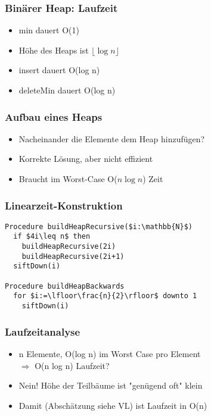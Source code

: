 

\begin{frame}
  \titlepage
\end{frame}

\begin{frame}
\frametitle{Binärer Heap: Laufzeit}
\begin{itemize}
\item min dauert O(1)\pause
\item Höhe des Heaps ist $\lfloor\log n\rfloor$\pause
\item insert dauert O(log n)
\item deleteMin dauert O(log n)
\end{itemize}
\end{frame}

\begin{frame}
\frametitle{Aufbau eines Heaps}
\begin{itemize}
\item Nacheinander die Elemente dem Heap hinzufügen?\pause
\item Korrekte Lösung, aber nicht effizient
\item Braucht im Worst-Case O($n\log n$) Zeit
\end{itemize}
\end{frame}

\begin{frame}[fragile]
\frametitle{Linearzeit-Konstruktion}
\begin{lstlisting}
Procedure buildHeapRecursive($i:\mathbb{N}$)
  if $4i\leq n$ then
    buildHeapRecursive(2i)
    buildHeapRecursive(2i+1)
  siftDown(i)

Procedure buildHeapBackwards
  for $i:=\lfloor\frac{n}{2}\rfloor$ downto 1
    siftDown(i)
\end{lstlisting}
\end{frame}

\begin{frame}
\frametitle{Laufzeitanalyse}
\begin{itemize}
\item n Elemente, O(log n) im Worst Case pro Element\\
$\Rightarrow$ O(n log n) Laufzeit?\pause
\item Nein! Höhe der Teilbäume ist "genügend oft" klein
\item Damit (Abschätzung siehe VL) ist Laufzeit in O(n)
\end{itemize}
\end{frame}

